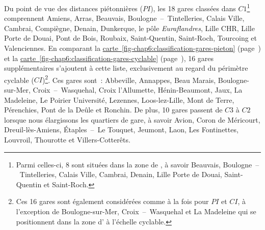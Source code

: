 \begin{refsegment}
Du point de vue des distances piétonnières (\(PI\)), les 18 gares classées dans \(C1\)\footnote{
    Parmi celles-ci, 8 sont situées dans la zone de , à savoir Beauvais, Boulogne~–~Tintelleries, Calais Ville, Cambrai, Denain, Lille Porte de Douai, Saint-Quentin et Saint-Roch.
} comprennent Amiens, Arras, Beauvais, Boulogne~–~Tintelleries, Calais Ville, Cambrai, Compiègne, Denain, Dunkerque, le pôle \textsl{Euraflandres}, Lille CHR, Lille Porte de Douai, Pont de Bois, Roubaix, Saint-Quentin, Saint-Roch, Tourcoing et Valenciennes. En comparant la \hyperref[fig-chap6:classification-gares-pieton]{carte~\ref{fig-chap6:classification-gares-pieton}} (page~\pageref{fig-chap6:classification-gares-pieton}) et la \hyperref[fig-chap6:classification-gares-cyclable]{carte~\ref{fig-chap6:classification-gares-cyclable}} (page~\pageref{fig-chap6:classification-gares-cyclable}), 16 gares supplémentaires s'ajoutent à cette liste, exclusivement au regard du périmètre cyclable (\(CI\))\footnote{
    Ces 16 gares sont également considérées comme  à la fois pour \(PI\) et \(CI\), à l'exception de Boulogne-sur-Mer, Croix~–~Wasquehal et La Madeleine qui se positionnent dans la zone d' à l'échelle cyclable.
}. Ces gares sont~: Abbeville, Annappes, Beau Marais, Boulogne-sur-Mer, Croix~–~Wasquehal, Croix l'Allumette, Hénin-Beaumont, Jaux, La Madeleine, Le Poirier Université, Lezennes, Loos-lez-Lille, Mont de Terre, Pérenchies, Pont de la Deûle et Ronchin. De plus, 10 gares passent de \(C3\) à \(C2\) lorsque nous élargissons les quartiers de gare, à savoir Avion, Coron de Méricourt, Dreuil-lès-Amiens, Étaples~–~Le Touquet, Jeumont, Laon, Les Fontinettes, Louvroil, Thourotte et Villers-Cotterêts.%



\end{refsegment}
